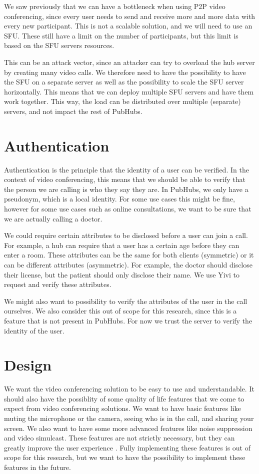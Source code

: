 \documentclass{report}
\begin{document}
We saw previously that we can have a bottleneck when using P2P video conferencing, since every user needs to send
and receive more and more data with every new participant. This is not a scalable solution, and we will need to use
an SFU. These still have a limit on the number of participants, but this limit is based on the SFU servers resources.

This can be an attack vector, since an attacker can try to overload the hub server by creating many video calls. We
therefore need to have the possibility to have the SFU on a separate server as well as the possibility to scale the SFU
server horizontally. This means that we can deploy multiple SFU servers and have them work together.
This way, the load can be distributed over multiple (separate) servers, and not impact the rest of PubHubs.

\section{Authentication}
Authentication is the principle that the identity of a user can be verified. In the context of video conferencing,
this means that we should be able to verify that the person we are calling is who they say they are. In PubHubs, we
only have a pseudonym, which is a local identity. For some use cases this might be fine, however for some use cases
such as online consultations, we want to be sure that we are actually calling a doctor.

We could require certain attributes to be disclosed before a user can join a call. For example, a hub
can require that a user has a certain age before they can enter a room. These attributes can be the same for both
clients (symmetric) or it can be different attributes (asymmetric). For example, the doctor should disclose their license, but the patient should only
disclose their name. We use Yivi to request and verify these attributes.

We might also want to possibility to verify the attributes of the user in the call ourselves. We also consider this out
of scope for this research, since this is a feature that is not present in PubHubs. For now we trust the server to
verify the identity of the user.

\section{Design}
We want the video conferencing solution to be easy to use and understandable. It should also have the possiblity of
some quality of life features that we come to expect from video conferencing solutions. We want to have basic
features like muting the microphone or the camera, seeing who is in the call, and sharing your screen. We also want
to have some more advanced features like noise suppression and video simulcast. These features are not strictly
necessary, but they can greatly improve the user experience \cite{Skowronek_Raake_Berndtsson_Rummukainen_Usai_Gunkel_Johanson_Habets_Malfait_Lindero_et al._2022}.
Fully implementing these features is out of scope for this research, but we want to have the possibility to implement
these features in the future.
\end{document}
